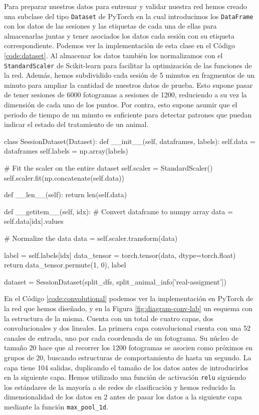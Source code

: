 Para preparar nuestros datos para entrenar y validar nuestra red hemos creado una subclase del tipo \texttt{Dataset} de PyTorch en la cual introducimos los \texttt{DataFrame} con los datos de las sesiones y las etiquetas de cada una de ellas para almacenarlas juntas y tener asociados los datos cada sesión con su etiqueta correspondiente. Podemos ver la implementación de esta clase en el Código \ref{code:dataset}. Al almacenar los datos también los normalizamos con el \texttt{StandardScaler} de Scikit-learn para facilitar la optimización de las funciones de la red. Además, hemos subdividido cada sesión de 5 minutos en fragmentos de un minuto para ampliar la cantidad de nuestros datos de prueba. Esto supone pasar de tener sesiones de 6000 fotogramas a sesiones de 1200, reduciendo a su vez la dimensión de cada uno de los puntos. Por contra, esto supone asumir que el periodo de tiempo de un minuto es suficiente para detectar patrones que puedan indicar el estado del tratamiento de un animal.

\begin{mypython}[float={h}, caption=\texttt{Dataset} de las sesiones, label={code:dataset}]
class SessionDataset(Dataset):
  def __init__(self, dataframes, labels):
    self.data = dataframes
    self.labels = np.array(labels)
    
    # Fit the scaler on the entire dataset
    self.scaler = StandardScaler()
    self.scaler.fit(np.concatenate(self.data))  

  def __len__(self):
    return len(self.data)

  def __getitem__(self, idx):
    # Convert dataframe to numpy array
    data = self.data[idx].values 

    # Normalize the data
    data = self.scaler.transform(data)

    label = self.labels[idx]
    data_tensor = torch.tensor(data, dtype=torch.float)
    return data_tensor.permute(1, 0), label

dataset = SessionDataset(split_dfs,
                         split_animal_info['real-assigment'])
\end{mypython}

En el Código \ref{code:convolutional} podemos ver la implementación en PyTorch de la red que hemos diseñado, y en la Figura \ref{fig:diagram-conv-lab} un esquema con la estructura de la misma. Cuenta con un total de cuatro capas, dos convolucionales y dos lineales. La primera capa convolucional cuenta con una 52 canales de entrada, uno por cada coordenada de un fotograma. Su núcleo de tamaño 20 hace que al recorrer los 1200 fotogramas se asocien como próximos en grupos de 20, buscando estructuras de comportamiento de hasta un segundo. La capa tiene 104 salidas, duplicando el tamaño de los datos antes de introducirlos en la siguiente capa. Hemos utilizado una función de activación \texttt{relu} siguiendo los estándares de la mayoría a de redes de clasificación y hemos reducido la dimensionalidad de los datos en 2 antes de pasar los datos a la siguiente capa mediante la función \texttt{max\_pool\_1d}.

